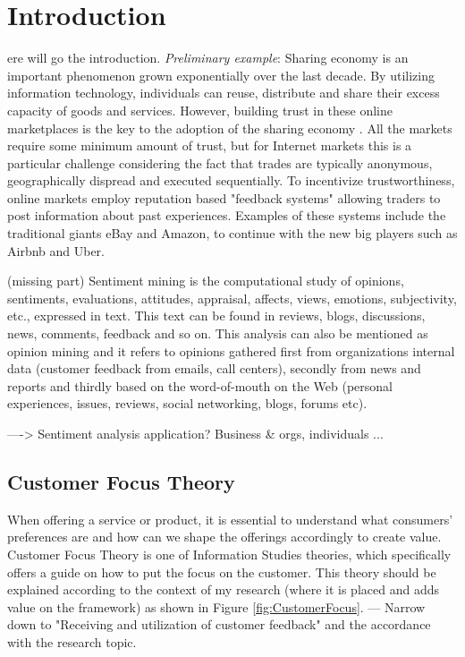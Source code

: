 %
%
\let\textcircled=\pgftextcircled
\chapter{Introduction}
\label{chap:intro}

ere will go the introduction. \textit{Preliminary example}: Sharing economy is an important phenomenon grown exponentially over the last decade. By utilizing information technology, individuals can reuse, distribute and share their excess capacity of goods and services. However, building trust in these online marketplaces is the key to the adoption of the sharing economy \cite{owen2014trust}. All the markets require some minimum amount of trust, but for Internet markets this is a particular challenge considering the fact that trades are typically anonymous, geographically dispread and executed sequentially. To incentivize trustworthiness, online markets employ reputation based "feedback systems" allowing traders to post information about past experiences. Examples of these systems include the traditional giants eBay and Amazon, to continue with the new big players such as Airbnb and Uber.

(missing part)
Sentiment mining is the computational study of opinions, sentiments, evaluations, attitudes, appraisal, affects, views, emotions, subjectivity, etc., expressed in text. This text can be found in reviews, blogs, discussions, news, comments, feedback and so on. This analysis can also be mentioned as opinion mining and it refers to opinions gathered first from organizations internal data (customer feedback from emails, call centers), secondly from news and reports and thirdly based on the word-of-mouth on the Web (personal experiences, issues, reviews, social networking, blogs, forums etc). 

----> Sentiment analysis application? Business \& orgs, individuals ...

\section{Customer Focus Theory}
\label{sec:CFTH}

When offering a service or product, it is essential to understand what consumers' preferences are and how can we shape the offerings accordingly to create value. Customer Focus Theory is one of Information Studies theories, which specifically offers a guide on how to put the focus on the customer. This theory should be explained according to the context of my research (where it is placed and adds value on the framework) as shown in Figure \ref{fig:CustomerFocus}. 
--- Narrow down to "Receiving and utilization of customer feedback" and the accordance with the research topic.


